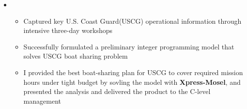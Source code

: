\documentclass[11pt,a4paper,sans]{moderncv}        %
\begin{document}
\begin{itemize}
	\vspace{4pt}

	\item{
		{\vspace{3pt}
			\begin{itemize}
				\item Captured key U.S. Coast Guard(USCG) operational information through intensive three-day workshops
				\item Successfully formulated a preliminary integer programming model that solves USCG boat sharing problem
				\item I provided the best boat-sharing plan for USCG to cover required mission hours under tight budget by sovling the model with \textbf{Xpress-Mosel}, and presented the analysis and delivered the product to the C-level management %
			\end{itemize}}}

	\vspace{4pt}


\end{itemize}
\end{document}
